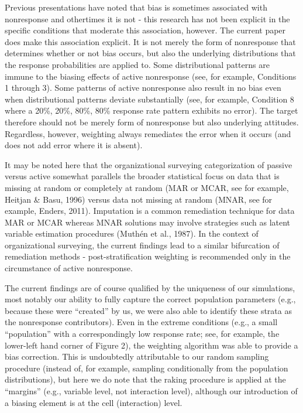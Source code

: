 \documentclass[
  man,mask]{apa7}
\begin{document}
Previous presentations have noted that bias is sometimes associated with nonresponse and othertimes it is not - this research has not been explicit in the specific conditions that moderate this association, however. The current paper does make this association explicit. It is not merely the form of nonresponse that determines whether or not bias occurs, but also the underlying distributions that the response probabilities are applied to. Some distributional patterns are immune to the biasing effects of active nonresponse (see, for example, Conditions 1 through 3). Some patterns of active nonresponse also result in no bias even when distributional patterns deviate substantially (see, for example, Condition 8 where a 20\%, 20\%, 80\%, 80\% response rate pattern exhibits no error). The target therefore should not be merely form of nonresponse but also underlying attitudes. Regardless, however, weighting always remediates the error when it occurs (and does not add error where it is absent).

It may be noted here that the organizational surveying categorization of passive versus active somewhat parallels the broader statistical focus on data that is missing at random or completely at random (MAR or MCAR, see for example, Heitjan \& Basu, 1996) versus data not missing at random (MNAR, see for example, Enders, 2011). Imputation is a common remediation technique for data MAR or MCAR whereas MNAR solutions may involve strategies such as latent variable estimation procedures (Muthén et al., 1987). In the context of organizational surveying, the current findings lead to a similar bifurcation of remediation methods - post-stratification weighting is recommended only in the circumstance of active nonresponse.

The current findings are of course qualified by the uniqueness of our simulations, most notably our ability to fully capture the correct population parameters (e.g., because these were ``created'' by us, we were also able to identify these strata as the nonresponse contributors). Even in the extreme conditions (e.g., a small ``population'' with a correspondingly low response rate; see, for example, the lower-left hand corner of Figure 2), the weighting algorithm was able to provide a bias correction. This is undoubtedly attributable to our random sampling procedure (instead of, for example, sampling conditionally from the population distributions), but here we do note that the raking procedure is applied at the ``margins'' (e.g., variable level, not interaction level), although our introduction of a biasing element is at the cell (interaction) level.
\end{document}
